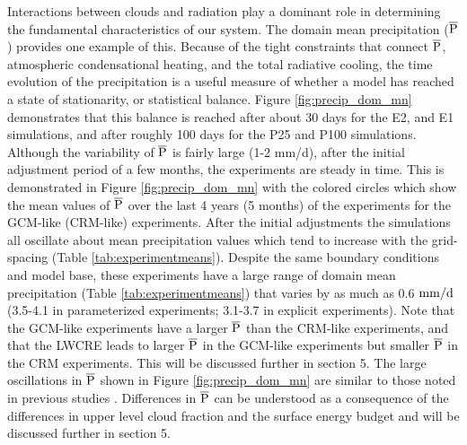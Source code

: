 \documentclass[draft]{agujournal2019}
\begin{document}
Interactions between clouds and radiation play a dominant role in determining the fundamental  
characteristics of our system.  The domain mean precipitation ($\overline{\rm{P}}$) provides one example of this.  
Because of the tight constraints that connect $\overline{\rm{P}}$, atmospheric condensational heating, and 
the total radiative cooling, the time evolution of the precipitation is a useful measure of whether a model has 
reached a state of stationarity, or statistical balance.  Figure \ref{fig:precip_dom_mn} demonstrates that this balance is reached after about 30 
days for the E2, and E1 simulations, and after roughly 100 days for the P25 and P100 simulations.  Although the variability
of  $\overline{\rm{P}}$ is fairly large (1-2 mm/d), after the initial adjustment period of a few months, the experiments are steady in time.  This
is demonstrated in Figure \ref{fig:precip_dom_mn} with the colored circles which show the mean values of $\overline{\rm{P}}$ over the last 4 years (5 months) of the experiments for the GCM-like (CRM-like) experiments.   
After the initial adjustments
the simulations all oscillate about mean precipitation values which tend to increase with the grid-spacing (Table \ref{tab:experimentmeans}).   
Despite the same boundary conditions and model base, these experiments have a large range of domain mean precipitation 
(Table \ref{tab:experimentmeans}) that varies by as much as 0.6 $\rm{mm/d}$ (3.5-4.1 in parameterized experiments; 3.1-3.7 in explicit experiments).  
Note that the GCM-like experiments have a larger $\rm{\overline{P}}$ than the CRM-like experiments, and that the
LWCRE leads to larger $\rm{\overline{P}}$ in the GCM-like experiments but smaller $\rm{\overline{P}}$ in the CRM experiments.  
This will be discussed further in section 5. 
The large oscillations in $\overline{\rm{P}}$ shown in Figure \ref{fig:precip_dom_mn} are similar to those noted in previous studies 
\cite{Silvers_etal_2016, Patrizio_Randall_2019}.
Differences in $\rm{\overline{P}}$ can be understood as a consequence of the differences in upper level cloud fraction 
and the surface energy budget and will be discussed further in section 5.   
\end{document}
